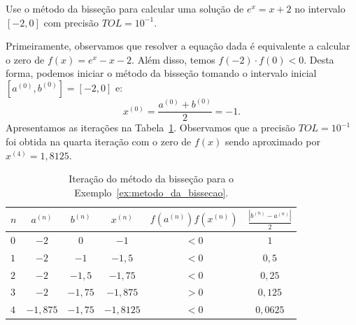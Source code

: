 \begin{ex}\label{ex:metodo_da_bissecao}Use o método da bisseção para calcular uma solução de $e^x = x + 2$ no intervalo $[-2, 0]$ com precisão $TOL = 10^{-1}$.
\end{ex}
\begin{sol}
  Primeiramente, observamos que resolver a equação dada é equivalente a calcular o zero de $f(x) = e^x - x - 2$. Além disso, temos $f(-2)\cdot f(0) < 0$. Desta forma, podemos iniciar o método da bisseção tomando o intervalo inicial $[a^{(0)}, b^{(0)}] = [-2, 0]$ e:
  \begin{equation*}
    x^{(0)} = \frac{a^{(0)} + b^{(0)}}{2} = -1.
  \end{equation*}
  Apresentamos as iterações na Tabela~\ref{tab:metodo_da_bissecao}. Observamos que a precisão $TOL = 10^{-1}$ foi obtida na quarta iteração com o zero de $f(x)$ sendo aproximado por $x^{(4)} = 1,8125$.
  \begin{table}
    \centering
    \caption{Iteração do método da bisseção para o Exemplo~\ref{ex:metodo_da_bissecao}.}
    \label{tab:metodo_da_bissecao}
    \begin{tabular}{l|ccc|c|c}\hline
      $n$ & $a^{(n)}$ & $b^{(n)}$ & $x^{(n)}$ & $f(a^{(n)})f(x^{(n)})$ & $\displaystyle \frac{|b^{(n)}-a^{(n)}|}{2}$\\\hline
      $0$ & $-2$ & $0$ & $-1$ & $< 0$ & $1$\\
      $1$ & $-2$ & $-1$ & $-1,5$ & $<0$ & $0,5$\\
      $2$ & $-2$ & $-1,5$ & $-1,75$ & $<0$ & $0,25$\\
      $3$ & $-2$ & $-1,75$ & $-1,875$ & $>0$ & $0,125$\\
      $4$ & $-1,875$ & $-1,75$ & $-1,8125$ & $<0$ & $0,0625$\\\hline
    \end{tabular}
  \end{table}
  

\end{sol}

